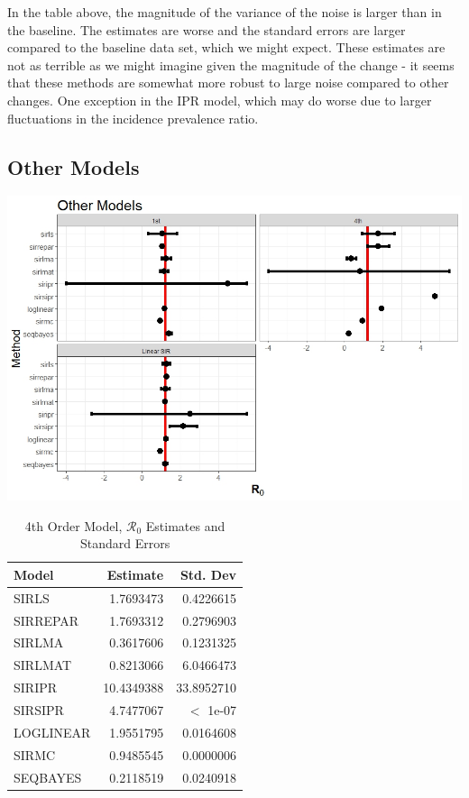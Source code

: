 \documentclass[12pt]{article}
\newcommand{\rr}{\ensuremath{\mathcal{R}_0}}
\begin{document}
In the table above, the magnitude of the variance of the noise is larger than in the baseline. The estimates are worse and the standard errors are larger compared to the baseline data set, which we might expect. These estimates are not as terrible as we might imagine given the magnitude of the change - it seems that these methods are somewhat more robust to large noise compared to other changes. One exception in the IPR model, which may do worse due to larger fluctuations in the incidence prevalence ratio. 

\subsection{Other Models}\label{sec:res-oth}

\begin{table}[H]

  \begin{center}
\includegraphics[scale=0.5]{other.jpeg}

\end{center}

\caption{\label{tab:} 4th Order Model, $\rr$ Estimates and Standard Errors}
\centering
\begin{tabular}[t]{l|r|r}
	\hline
	Model & Estimate & Std. Dev\\
	\hline
	SIRLS & 1.7693473 & 0.4226615\\
	\hline
	SIRREPAR & 1.7693312 & 0.2796903\\
	\hline
	SIRLMA & 0.3617606 & 0.1231325\\
	\hline
	SIRLMAT & 0.8213066 & 6.0466473\\
	\hline
	SIRIPR & 10.4349388 & 33.8952710\\
	\hline
	SIRSIPR & 4.7477067 &  $<$ 1e-07\\
	\hline
	LOGLINEAR & 1.9551795 & 0.0164608\\
	\hline
	SIRMC & 0.9485545 & 0.0000006\\
	\hline
	SEQBAYES & 0.2118519 & 0.0240918\\
	\hline
\end{tabular}
\end{table}
\end{document}
